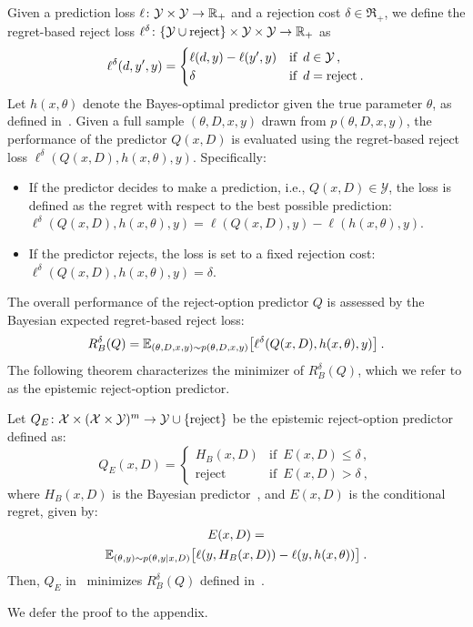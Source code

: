 Given a prediction loss $\ell\colon{\cal Y}\times{\cal Y}\rightarrow\mathbb{R}_+$ and a rejection cost $\delta\in\Re_+$, we define the regret-based reject loss $\ell^\delta\colon\{{\cal Y}\cup \text{reject}\}\times{\cal Y}\times{\cal Y}\rightarrow\mathbb{R}_+$ as
\[
 \ell^{\delta}(d,y',y) = \begin{cases}
    \ell(d,y)-\ell(y',y) & \text{if }\, d\in{\cal Y} \,,\\
    \delta & \text{if }\, d=\text{reject} \:.
 \end{cases}
\]
%
Let $h(x,\theta)$ denote the Bayes-optimal predictor given the true parameter $\theta$, as defined in~.
Given a full sample $(\theta, D, x, y)$ drawn from $p(\theta,D,x,y)$, the performance of the predictor $Q(x, D)$ is evaluated using the regret-based reject loss $\ell^\delta(Q(x, D), h(x, \theta), y)$. Specifically:
\begin{itemize}
\item If the predictor decides to make a prediction, i.e., $Q(x, D) \in \mathcal{Y}$, the loss is defined as the regret with respect to the best possible prediction: $\ell^\delta(Q(x, D), h(x, \theta), y) = \ell(Q(x, D), y) - \ell(h(x, \theta), y)$.
\item If the predictor rejects, the loss is set to a fixed rejection cost:
$\ell^\delta(Q(x, D), h(x, \theta), y) = \delta$.
\end{itemize}
%
The overall performance of the reject-option predictor $Q$ is assessed by the Bayesian expected regret-based reject loss:
\begin{equation}
  \label{equ:ExpectedRejectRegret}
 R_B^\delta(Q)=
 {\mathbb{E}}_{(\theta,D,x,y)\sim p(\theta,D,x,y)} \big [
 \ell^\delta(Q(x,D),h(x,\theta),y)\big ] \:.
\end{equation}
%
The following theorem characterizes the minimizer of $R_B^\delta(Q)$, which we refer to as the epistemic reject-option predictor.
%
\begin{theorem}Let $Q_E\colon{\cal X}\times({\cal X}\times{\cal Y})^m\rightarrow{\cal Y}\cup \{\text{reject}\}$ 
be the epistemic reject-option predictor defined as:
\begin{equation}
\label{equ:OptEpistRejOptPred}
   Q_E(x,D) = \begin{cases}
       H_B(x,D) & \text{if }\, E(x,D) \leq \delta\,,\\
       \text{reject} & \text{if }\, E(x,D) > \delta \:,
   \end{cases}    
\end{equation}
%
where $H_B(x,D)$ is the Bayesian predictor~, and $E(x,D)$ is the  conditional regret, given by:
\begin{multline}
  \label{equ:ConditionalRegret}
  E(x,D) = \\{\mathbb{E}}_{(\theta,y)\sim p(\theta,y|x,D)}\big [ \ell(y,H_B(x,D)) - \ell(y,h(x,\theta)) \big ]\:.
\end{multline}
%
Then, $Q_E$ in~ minimizes  $R_B^\delta(Q)$ defined in~. 
\end{theorem}
We defer the proof to the appendix.

